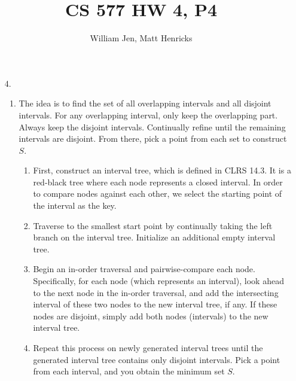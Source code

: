 \documentclass{article}
\title{CS 577 HW 4, P4}
\author{William Jen, Matt Henricks}
\date{}
\begin{document}
\maketitle

\begin{enumerate}
    \item[4.]
        \begin{enumerate}
            \item The idea is to find the set of all overlapping intervals and all disjoint intervals. 
                For any overlapping interval, only keep the overlapping part. Always keep the disjoint intervals. Continually refine until the remaining intervals are disjoint. From there, pick a point from 
                each set to construct
                $S$. 
                \begin{enumerate}
                    \item First, construct an interval tree, which is defined in CLRS 14.3. It is a red-black
                        tree where each node represents a closed interval. In order to compare nodes
                        against each other, we select the starting point of the interval as the key.
                    \item Traverse to the smallest start point by continually taking the left branch on the
                        interval tree. Initialize an additional empty interval tree.
                    \item Begin an in-order traversal and pairwise-compare each node. Specifically, for each 
                        node (which represents an interval), look ahead to the next node in the 
                        in-order traversal, and add the intersecting interval of these two nodes to the 
                        new interval tree, if any. If these nodes are disjoint, simply add both nodes
                        (intervals) to the new interval tree. 
                    \item Repeat this process on newly generated interval trees until the generated
                        interval tree contains only disjoint intervals. Pick a point from each interval, 
                        and you obtain the minimum set $S$.
                \end{enumerate}
            

\end{enumerate}
\end{enumerate}
\end{document}
